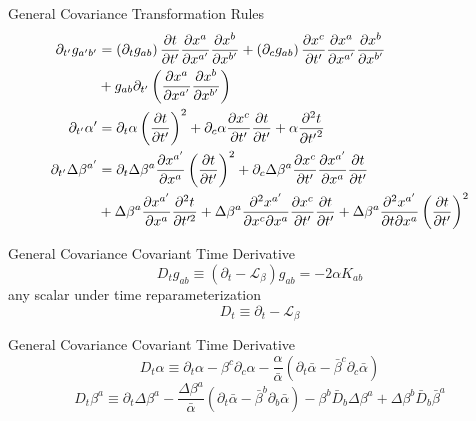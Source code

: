 \documentclass[xcolor=dvipsnames]{beamer}
\begin{document}
	\begin{frame}{General Covariance}
		Transformation Rules
		\begin{align*}
			\partial_{t'}g_{a'b'} &=  \left(\partial_{t}g_{ab}\right)\frac{\partial t}{\partial t'}\frac{\partial x^{a}}{\partial x^{a'}}\frac{\partial x^{b}}{\partial x^{b'}} + \left(\partial_{c}g_{ab}\right)\frac{\partial x^{c}}{\partial t'}\frac{\partial x^{a}}{\partial x^{a'}}\frac{\partial x^{b}}{\partial x^{b'}} \\
			&+ g_{ab}\partial_{t'}\left(\frac{\partial x^{a}}{\partial x^{a'}}\frac{\partial x^{b}}{\partial x^{b'}}\right)\\
			\partial_{t'}\alpha' &= \partial_{t}\alpha\left(\frac{\partial t}{\partial t'}\right)^{2} + \partial_{c}\alpha\frac{\partial x^{c}}{\partial t'}\frac{\partial t}{\partial t'} + \alpha\frac{\partial^{2}t}{\partial {t'}^{2}}\\
			\partial_{t'}\Delta \beta^{a'} &= \partial_{t}\Delta \beta^{a}\frac{\partial x^{a'}}{\partial x^{a}}\left(\frac{\partial t}{\partial t'}\right)^{2} + \partial_{c}\Delta \beta^{a}\frac{\partial x^{c}}{\partial t'}\frac{\partial x^{a'}}{\partial x^{a}}\frac{\partial t}{\partial t'}\notag\\
			& + \Delta \beta^{a}\frac{\partial x^{a'}}{\partial x^{a}}\frac{\partial^{2}t}{\partial t'^{2}} + \Delta \beta^{a}\frac{\partial^{2} x^{a'}}{\partial x^{c}\partial x^{a}}\frac{\partial x^{c}}{\partial t'}\frac{\partial t}{\partial t'} + \Delta \beta^{a}\frac{\partial^{2}x^{a'}}{\partial t\partial x^{a}}\left(\frac{\partial t}{\partial t'}\right)^{2}
		\end{align*}
	\end{frame}
	\begin{frame}{General Covariance}
		Covariant Time Derivative
		\pause
		\[
			D_{t}g_{ab} \equiv (\partial_{t} - \mathcal{L}_{\beta})g_{ab} = -2\alpha K_{ab}
		\]
		\pause
		any scalar under time reparameterization
		\[
			D_{t} \equiv \partial_{t} - \mathcal{L}_{\beta} 
		\]		
	\end{frame}
	\begin{frame}{General Covariance}
		Covariant Time Derivative
		\[
		D_{t}\alpha \equiv \partial_{t}\alpha - \beta^{c}\partial_{c}\alpha - \frac{\alpha}{{\bar \alpha}}\left(\partial_{t}{\bar \alpha} - {\bar \beta}^{c}\partial_{c}{\bar \alpha}\right)
		\]
		\pause
		\[
		D_{t}\beta^{a} \equiv \partial_{t}\Delta \beta^{a} - \frac{\Delta \beta^{a}}{{\bar \alpha}}\left(\partial_{t}{\bar \alpha} - {\bar \beta}^{b}\partial_{b}{\bar \alpha}\right) - \beta^{b}{\bar D}_{b}\Delta \beta^{a} + \Delta \beta^{b}{\bar D}_{b}{\bar \beta}^{a}
		\]
	\end{frame}
\end{document}
